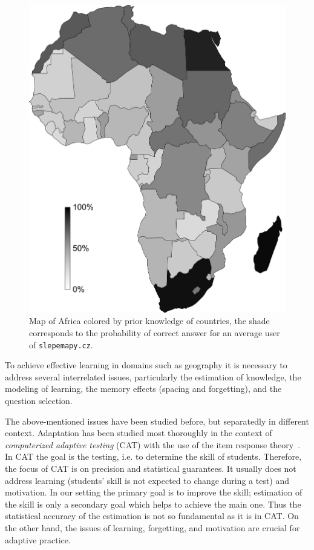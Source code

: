 \documentclass{edm_template}
\begin{document}
\begin{figure}[t]
  \centering

  \includegraphics[width=.8\linewidth]{edm-2014-geography-models/africa-with-scale}

  \caption{Map of Africa colored by prior knowledge of countries, the shade
    corresponds to the probability of correct answer for an average user of
    \texttt{slepemapy.cz}. }
  \label{fig:africa}
\end{figure}

To achieve effective learning in domains such as geography it is necessary to
address several interrelated issues, particularly the estimation of knowledge,
the modeling of learning, the memory effects (spacing and forgetting), and the
question selection.

The above-mentioned issues have been studied before, but separatedly in different
context. Adaptation has been studied most thoroughly in the context of
\emph{computerized adaptive testing} (CAT) with the use of the item response
theory~\cite{de2008theory}. In CAT the goal is the testing, i.e. to determine
the skill of students. Therefore, the focus of CAT is on precision and statistical
guarantees. It usually does not address learning (students' skill is not
expected to change during a test) and motivation. In our setting the primary
goal is to improve the skill; estimation of the skill is only a secondary goal which
helps to achieve the main one. Thus the statistical accuracy of the estimation
is not so fundamental as it is in CAT. On the other hand, the issues of learning,
forgetting, and motivation are crucial for adaptive practice.
\end{document}

